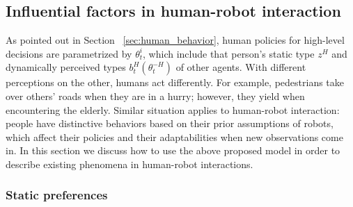 \documentclass[letterpaper, 10 pt, conference]{ieeeconf}  %
\begin{document}
\color{black}\subsection{Influential factors in human-robot interaction}
As pointed out in Section ~\ref{sec:human_behavior}, human policies for high-level decisions are parametrized by $\theta^i_t$, which include that person's static type $z^H$ and dynamically perceived types $b^H_t(\theta^{-H}_t)$ of other agents. With different perceptions on the other, humans act differently. For example, pedestrians take over others' roads when they are in a hurry; however, they yield when encountering the elderly. Similar situation 
applies to human-robot interaction: people have distinctive behaviors based on their prior assumptions of robots, which affect their policies and their adaptabilities when new observations come in. In this section we discuss how to use the above proposed model in order to describe	 existing phenomena in human-robot interactions. 

\subsubsection{Static preferences}
\end{document}

